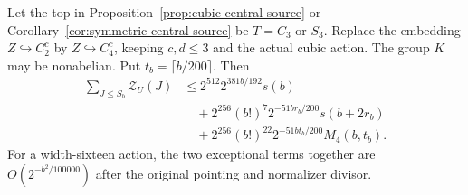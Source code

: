 \begin{samepage}
\begin{proposition}
\label{prop:central-c4-complete-source}
Let the top in Proposition~\ref{prop:cubic-central-source} or
Corollary~\ref{cor:symmetric-central-source} be $T=C_3$ or $S_3$.
Replace the embedding $Z\hookrightarrow C_2^c$ by
$Z\hookrightarrow C_4^c$, keeping $c,d\leq3$ and the actual cubic
action. The group $K$ may be nonabelian. Put $t_b=\lceil b/200\rceil$.
Then
\begin{align*}
 \sum_{J\leq S_b}\mathcal Z_U(J)
 &\leq 2^{512}2^{381b/192}s(b)\\
 &\quad+2^{256}(b!)^7 2^{-51br_b/200}s(b+2r_b)\\
 &\quad+2^{256}(b!)^{22}2^{-51bt_b/200}M_4(b,t_b).
\end{align*}
For a width-sixteen action, the two exceptional terms together are
$O(2^{-b^2/100000})$ after the original pointing and normalizer divisor.
\end{proposition}
\end{samepage}
